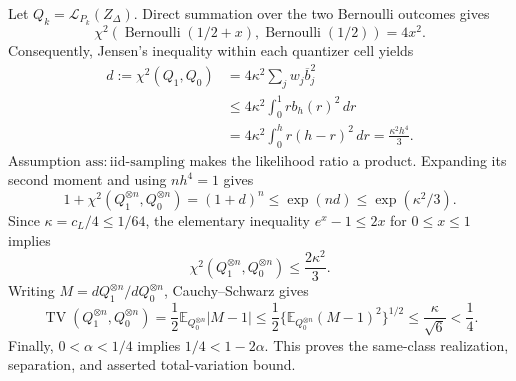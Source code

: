 Let \(Q_k=\mathcal L_{P_k}(Z_\Delta)\).  Direct summation over the two Bernoulli outcomes gives
\[
 \chi^2\!\left(\operatorname{Bernoulli}(1/2+x),
                    \operatorname{Bernoulli}(1/2)\right)=4x^2.
\]
Consequently, Jensen's inequality within each quantizer cell yields
\[
 \begin{aligned}
 d:=\chi^2(Q_1,Q_0)
 &=4\kappa^2\sum_jw_j\overline b_j^2\\
 &\leq4\kappa^2\int_0^1rb_h(r)^2\,dr\\
 &=4\kappa^2\int_0^h r(h-r)^2\,dr
 =\frac{\kappa^2h^4}{3}.
 \end{aligned}
\]
Assumption \(\mathrm{ass:iid\text{-}sampling}\) makes the likelihood ratio a product.  Expanding its second moment and using \(nh^4=1\) gives
\[
 1+\chi^2(Q_1^{\otimes n},Q_0^{\otimes n})
 =(1+d)^n
 \leq\exp(nd)
 \leq\exp(\kappa^2/3).
\]
Since \(\kappa=c_L/4\leq1/64\), the elementary inequality \(e^x-1\leq2x\) for \(0\leq x\leq1\) implies
\[
 \chi^2(Q_1^{\otimes n},Q_0^{\otimes n})
 \leq\frac{2\kappa^2}{3}.
\]
Writing \(M=dQ_1^{\otimes n}/dQ_0^{\otimes n}\), Cauchy--Schwarz gives
\[
 \operatorname{TV}(Q_1^{\otimes n},Q_0^{\otimes n})
 =\frac12\mathbb E_{Q_0^{\otimes n}}|M-1|
 \leq\frac12\{\mathbb E_{Q_0^{\otimes n}}(M-1)^2\}^{1/2}
 \leq\frac{\kappa}{\sqrt6}<\frac14.
\]
Finally, \(0<\alpha<1/4\) implies \(1/4<1-2\alpha\).  This proves the same-class realization, separation, and asserted total-variation bound.